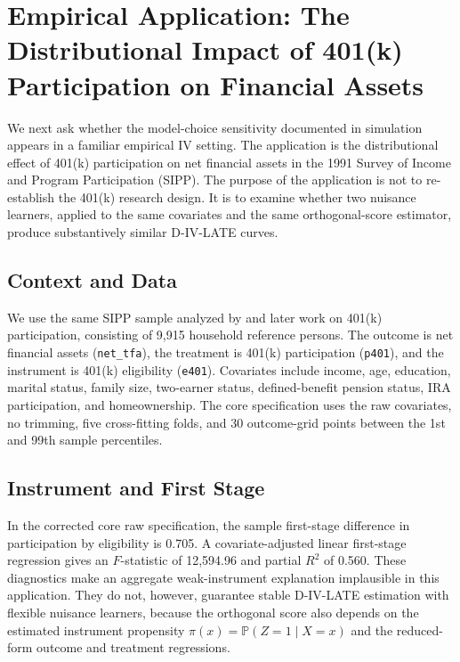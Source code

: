 \documentclass[final,3p,fleqn, 10pt]{elsarticle}
\begin{document}
\section{Empirical Application: The Distributional Impact of 401(k) Participation on Financial Assets}
\label{sec:empirical_app}

We next ask whether the model-choice sensitivity documented in simulation appears in a familiar empirical IV setting. The application is the distributional effect of 401(k) participation on net financial assets in the 1991 Survey of Income and Program Participation (SIPP). The purpose of the application is not to re-establish the 401(k) research design. It is to examine whether two nuisance learners, applied to the same covariates and the same orthogonal-score estimator, produce substantively similar D-IV-LATE curves.

\subsection{Context and Data}
We use the same SIPP sample analyzed by \citet{chernozhukov2004impact} and later work on 401(k) participation, consisting of 9,915 household reference persons. The outcome is net financial assets (\texttt{net\_tfa}), the treatment is 401(k) participation (\texttt{p401}), and the instrument is 401(k) eligibility (\texttt{e401}). Covariates include income, age, education, marital status, family size, two-earner status, defined-benefit pension status, IRA participation, and homeownership. The core specification uses the raw covariates, no trimming, five cross-fitting folds, and 30 outcome-grid points between the 1st and 99th sample percentiles.

\subsection{Instrument and First Stage}
In the corrected core raw specification, the sample first-stage difference in participation by eligibility is 0.705. A covariate-adjusted linear first-stage regression gives an $F$-statistic of 12,594.96 and partial $R^2$ of 0.560. These diagnostics make an aggregate weak-instrument explanation implausible in this application. They do not, however, guarantee stable D-IV-LATE estimation with flexible nuisance learners, because the orthogonal score also depends on the estimated instrument propensity $\pi(x)=\mathbb{P}(Z=1\mid X=x)$ and the reduced-form outcome and treatment regressions.
\end{document}
